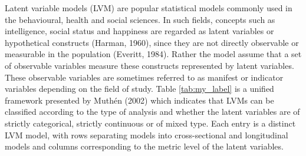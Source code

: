 Latent variable models (LVM) are popular statistical models commonly used in the behavioural, health and social sciences. In such fields, concepts such as intelligence, social status and happiness are regarded as latent variables or hypothetical constructs (Harman, 1960), since they are not directly observable or measurable in the population (Everitt, 1984). 
Rather the model assume that a set of observable variables measure these constructs represented by latent variables. These observable variables are sometimes referred to as manifest or indicator variables depending on the field of study. Table \ref{tab:my_label} is a unified framework presented by Muth\'en (2002) which indicates that LVMs can be classified according to the type of analysis and whether the latent variables are of strictly categorical, strictly continuous or of mixed type. Each entry is a distinct LVM model, with rows separating models into cross-sectional and longitudinal models and columns corresponding to the metric level of the latent variables.  

